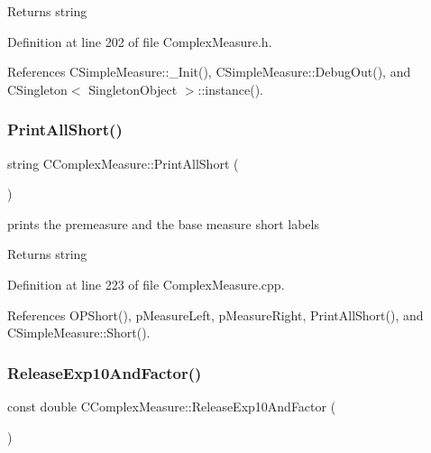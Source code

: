 \begin{DoxyReturn}{Returns}
string 
\end{DoxyReturn}


Definition at line 202 of file Complex\+Measure.\+h.



References C\+Simple\+Measure\+::\+\_\+\+Init(), C\+Simple\+Measure\+::\+Debug\+Out(), and C\+Singleton$<$ Singleton\+Object $>$\+::instance().

\mbox{\label{classCComplexMeasure_aefe6745e32e203d0dd2b7a4e13504142}} 
\subsubsection{\texorpdfstring{Print\+All\+Short()}{PrintAllShort()}}
{\footnotesize\ttfamily string C\+Complex\+Measure\+::\+Print\+All\+Short (\begin{DoxyParamCaption}{ }\end{DoxyParamCaption})}



prints the premeasure and the base measure short labels 

\begin{DoxyReturn}{Returns}
string 
\end{DoxyReturn}


Definition at line 223 of file Complex\+Measure.\+cpp.



References O\+P\+Short(), p\+Measure\+Left, p\+Measure\+Right, Print\+All\+Short(), and C\+Simple\+Measure\+::\+Short().

\mbox{\label{classCComplexMeasure_a2c4086ab6b664259b820f554f647cdbd}} 
\subsubsection{\texorpdfstring{Release\+Exp10\+And\+Factor()}{ReleaseExp10AndFactor()}}
{\footnotesize\ttfamily const double C\+Complex\+Measure\+::\+Release\+Exp10\+And\+Factor (\begin{DoxyParamCaption}{ }\end{DoxyParamCaption})\hspace{0.3cm}{\ttfamily [protected]}}



